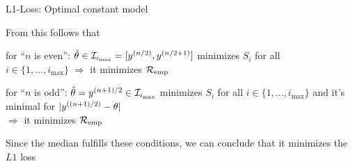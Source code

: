 \documentclass[11pt,compress,t,notes=noshow, xcolor=table]{beamer}
\begin{document}
\begin{frame}{L1-Loss: Optimal constant model}

From this follows that

\vfill

\begin{itemizeL}[sep=5]
\item for \enquote{$n$ is even}: $\thetah \in  \mathcal{I}_{i_{\max}} = [y^{(n/2)},y^{(n/2+1)}]$ minimizes $S_i$ for all $i \in \{1,\dots, i_{\max}\} \; \Rightarrow$  it minimizes $\riske$
\item for \enquote{$n$ is odd}: $\thetah = y^{(n+1)/2} \in \mathcal{I}_{i_{\max}}$ minimizes $S_i$ for all $i \in \{1,\dots, i_{\max}\}$ and it's minimal for
$|\yi[(n + 1)/2] - \theta|$ \\ $\Rightarrow$
it minimizes $\riske$
\end{itemizeL}
\vfill
Since the median fulfills these conditions, we can conclude that it minimizes 
the $L1$ loss

\end{frame}


\endlecture
\end{document}
